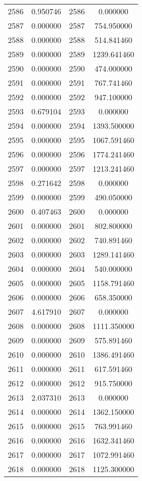 \documentclass[12pt]{article}
\begin{document}
\begin{longtable}{@{}cccc@{}}
2586 & 0.950746 & 2586 & 0.000000 \\
2587 & 0.000000 & 2587 & 754.950000 \\
2588 & 0.000000 & 2588 & 514.841460 \\
2589 & 0.000000 & 2589 & 1239.641460 \\
2590 & 0.000000 & 2590 & 474.000000 \\
2591 & 0.000000 & 2591 & 767.741460 \\
2592 & 0.000000 & 2592 & 947.100000 \\
2593 & 0.679104 & 2593 & 0.000000 \\
2594 & 0.000000 & 2594 & 1393.500000 \\
2595 & 0.000000 & 2595 & 1067.591460 \\
2596 & 0.000000 & 2596 & 1774.241460 \\
2597 & 0.000000 & 2597 & 1213.241460 \\
2598 & 0.271642 & 2598 & 0.000000 \\
2599 & 0.000000 & 2599 & 490.050000 \\
2600 & 0.407463 & 2600 & 0.000000 \\
2601 & 0.000000 & 2601 & 802.800000 \\
2602 & 0.000000 & 2602 & 740.891460 \\
2603 & 0.000000 & 2603 & 1289.141460 \\
2604 & 0.000000 & 2604 & 540.000000 \\
2605 & 0.000000 & 2605 & 1158.791460 \\
2606 & 0.000000 & 2606 & 658.350000 \\
2607 & 4.617910 & 2607 & 0.000000 \\
2608 & 0.000000 & 2608 & 1111.350000 \\
2609 & 0.000000 & 2609 & 575.891460 \\
2610 & 0.000000 & 2610 & 1386.491460 \\
2611 & 0.000000 & 2611 & 617.591460 \\
2612 & 0.000000 & 2612 & 915.750000 \\
2613 & 2.037310 & 2613 & 0.000000 \\
2614 & 0.000000 & 2614 & 1362.150000 \\
2615 & 0.000000 & 2615 & 763.991460 \\
2616 & 0.000000 & 2616 & 1632.341460 \\
2617 & 0.000000 & 2617 & 1072.991460 \\
2618 & 0.000000 & 2618 & 1125.300000 \\

\end{longtable}
\end{document}
